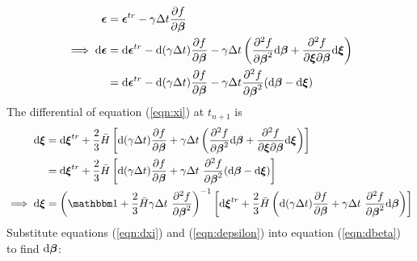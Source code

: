 \documentclass[10pt]{article}
\begin{document}
\begin{equation}
\begin{aligned}
\mbox{\boldmath$\epsilon$} &= \mbox{\boldmath$\epsilon$}^{tr}-\gamma\Delta t
\frac{\partial f}{\partial \mbox{\boldmath$\beta$}}\\
\implies \mathrm{d}\mbox{\boldmath$\epsilon$} &= \mathrm{d}\mbox{\boldmath$\epsilon$}^{tr}
- \mathrm{d}(\gamma\Delta t)
\frac{\partial f}{\partial \mbox{\boldmath$\beta$}}
-\gamma\Delta t
\left(\frac{\partial^2 f}{\partial \mbox{\boldmath$\beta$}^2}
\mathrm{d}\mbox{\boldmath$\beta$}
+\frac{\partial^2 f}{\partial \mbox{\boldmath$\xi$} \partial \mbox{\boldmath$\beta$}}
\mathrm{d}\mbox{\boldmath$\xi$}\right)\\
&= \mathrm{d}\mbox{\boldmath$\epsilon$}^{tr}
- \mathrm{d}(\gamma\Delta t)
\frac{\partial f}{\partial \mbox{\boldmath$\beta$}}
-\gamma\Delta t
\frac{\partial^2 f}{\partial \mbox{\boldmath$\beta$}^2}
(\mathrm{d}\mbox{\boldmath$\beta$}
- \mathrm{d}\mbox{\boldmath$\xi$})
\label{eqn:depsilon}
\end{aligned}
\end{equation}
The differential of equation (\ref{eqn:xi}) at $t_{n+1}$ is
\begin{equation}
\begin{aligned}
\mathrm{d}\Bxi &= \mathrm{d}\Bxi^{tr} +
\frac{2}{3}\bar{H}\left[
\mathrm{d}(\gamma\Delta t)\frac{\partial f}{\partial\Bbeta}
+
\gamma\Delta t\left(
\frac{\partial^2 f}{\partial\Bbeta^2}\mathrm{d}\Bbeta
+ \frac{\partial^2 f}{\partial\Bxi\partial\Bbeta}\mathrm{d}\Bxi\right)
\right]\\
&= \mathrm{d}\Bxi^{tr} +
\frac{2}{3}\bar{H}\left[
\mathrm{d}(\gamma\Delta t)\frac{\partial f}{\partial\Bbeta}
+
\gamma\Delta t\
\frac{\partial^2 f}{\partial\Bbeta^2}
(\mathrm{d}\Bbeta
- \mathrm{d}\Bxi)
\right]\\
\implies
\mathrm{d}\Bxi  &=
\left(\iso + \frac{2}{3}\bar{H}
\gamma\Delta t\
\frac{\partial^2 f}{\partial\Bbeta^2}
\right)^{-1}
\left[
\mathrm{d}\Bxi^{tr} +
\frac{2}{3}\bar{H}\left(
\mathrm{d}(\gamma\Delta t)\frac{\partial f}{\partial\Bbeta}
+
\gamma\Delta t\
\frac{\partial^2 f}{\partial\Bbeta^2}
\mathrm{d}\Bbeta
\right)\right]
\label{eqn:dxi}
\end{aligned}
\end{equation}
Substitute equations (\ref{eqn:dxi}) and (\ref{eqn:depsilon}) into equation (\ref{eqn:dbeta}) to find $\mathrm{d}\mbox{\boldmath$\beta$}$:
\end{document}
